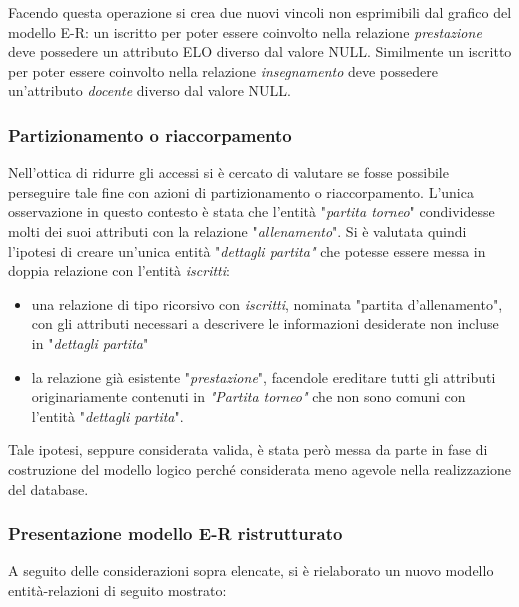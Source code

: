 \documentclass{article}
\begin{document}
    Facendo questa operazione si crea due nuovi vincoli non esprimibili dal grafico del modello E-R: un iscritto per poter essere coinvolto nella relazione \textit{prestazione} deve possedere un attributo ELO diverso dal valore NULL. Similmente un iscritto per poter essere coinvolto nella relazione \textit{insegnamento} deve possedere un'attributo \textit{docente} diverso dal valore NULL.

    \subsubsection{Partizionamento o riaccorpamento}

    Nell'ottica di ridurre gli accessi si è cercato di valutare se fosse possibile perseguire tale fine con azioni di partizionamento o riaccorpamento. L'unica osservazione in questo contesto è stata che l'entità "\textit{partita torneo}" condividesse molti dei suoi attributi con la relazione "\textit{allenamento}". Si è valutata quindi l'ipotesi di creare un'unica entità "\textit{dettagli partita"} che potesse essere messa in doppia relazione con l'entità \textit{iscritti}:
    \begin{itemize}
        \item una relazione di tipo ricorsivo con \textit{iscritti}, nominata "partita d'allenamento", con gli attributi necessari a descrivere le informazioni desiderate non incluse in "\textit{dettagli partita}"
        \item la relazione già esistente "\textit{prestazione}", facendole ereditare tutti gli attributi originariamente contenuti in \textit{"Partita torneo"} che non sono comuni con l'entità "\textit{dettagli partita}".
    \end{itemize}
    Tale ipotesi, seppure considerata valida, è stata però messa da parte in fase di costruzione del modello logico perché considerata meno agevole nella realizzazione del database.

    \subsubsection{Presentazione modello E-R ristrutturato}

    A seguito delle considerazioni sopra elencate, si è rielaborato un nuovo modello entità-relazioni di seguito mostrato:

    \begin{center}
    \end{center}
\end{document}

